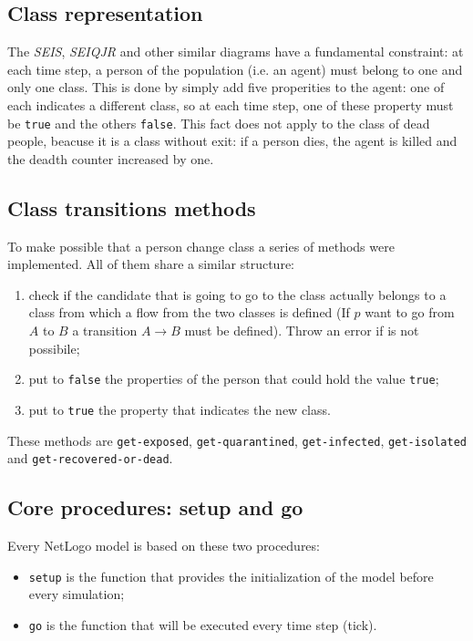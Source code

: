 \documentclass[12pt]{llncs}
\begin{document}
\subsection{Class representation}
The \textit{SEIS}, \textit{SEIQJR} and other similar diagrams have a fundamental constraint: at each time step, a person of the population (i.e. an agent) must belong to one and only one class. This is done by simply add five properities to the agent: one of each indicates a different class, so at each time step, one of these property must be \texttt{true} and the others \texttt{false}. This fact does not apply to the class of dead people, beacuse it is a class without exit: if a person dies, the agent is killed and the deadth counter increased by one.

\subsection{Class transitions methods}
To make possible that a person change class a series of methods were implemented. All of them share a similar structure:
\begin{enumerate}
\item check if the candidate that is going to go to the class actually belongs to a class from which a flow from the two classes is defined (If $p$ want to go from $A$ to $B$ a transition $A \rightarrow B$ must be defined). Throw an error if is not possibile;
\item put to \texttt{false} the properties of the person that could hold the value \texttt{true};
\item put to \texttt{true} the property that indicates the new class.
\end{enumerate}
These methods are \texttt{get-exposed}, \texttt{get-quarantined}, \texttt{get-infected}, \texttt{get-isolated} and \texttt{get-recovered-or-dead}.

\subsection{Core procedures: setup and go}
Every NetLogo model is based on these two procedures:
\begin{itemize}
\item \texttt{setup} is the function that provides the initialization of the model before every simulation;
\item \texttt{go} is the function that will be executed every time step (tick).
\end{itemize}
\end{document}
